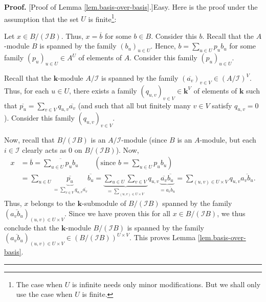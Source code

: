\documentclass[numbers=enddot,12pt,final,onecolumn,notitlepage]{scrartcl}%
\theoremstyle{definition}
\newenvironment{proof}[1][Proof]{\noindent\textbf{#1.} }{\ \rule{0.5em}{0.5em}}
\let\sumnonlimits\sum
\renewcommand{\sum}{\sumnonlimits\limits}
\begin{document}
\begin{proof}
[Proof of Lemma \ref{lem.basis-over-basis}.]Easy. Here is the proof under the
assumption that the set $U$ is finite\footnote{The case when $U$ is infinite
needs only minor modifications. But we shall only use the case when $U$ is
finite.}:

Let $x\in B/\left(  \mathcal{I}B\right)  $. Thus, $x=\overline{b}$ for some
$b\in B$. Consider this $b$. Recall that the $A$-module $B$ is spanned by the
family $\left(  b_{u}\right)  _{u\in U}$. Hence, $b=\sum_{u\in U}p_{u}b_{u}$
for some family $\left(  p_{u}\right)  _{u\in U}\in A^{U}$ of elements of $A$.
Consider this family $\left(  p_{u}\right)  _{u\in U}$.

Recall that the $\mathbf{k}$-module $A/\mathcal{I}$ is spanned by the family
$\left(  \overline{a_{v}}\right)  _{v\in V}\in\left(  A/\mathcal{I}\right)
^{V}$. Thus, for each $u\in U$, there exists a family $\left(  q_{u,v}\right)
_{v\in V}\in\mathbf{k}^{V}$ of elements of $\mathbf{k}$ such that
$\overline{p_{u}}=\sum_{v\in V}q_{u,v}\overline{a_{v}}$ (and such that all but
finitely many $v\in V$ satisfy $q_{u,v}=0$). Consider this family $\left(
q_{u,v}\right)  _{v\in V}$.

Now, recall that $B/\left(  \mathcal{I}B\right)  $ is an $A/\mathcal{I}%
$-module (since $B$ is an $A$-module, but each $i\in\mathcal{I}$ clearly acts
as $0$ on $B/\left(  \mathcal{I}B\right)  $). Now,%
\begin{align*}
x  &  =\overline{b}=\overline{\sum_{u\in U}p_{u}b_{u}}%
\ \ \ \ \ \ \ \ \ \ \left(  \text{since }b=\sum_{u\in U}p_{u}b_{u}\right) \\
&  =\sum_{u\in U}\underbrace{\overline{p_{u}}}_{=\sum_{v\in V}q_{u,v}%
\overline{a_{v}}}\overline{b_{u}}=\underbrace{\sum_{u\in U}\sum_{v\in V}%
}_{=\sum_{\left(  u,v\right)  \in U\times V}}q_{u,v}\underbrace{\overline
{a_{v}}\overline{b_{u}}}_{=\overline{a_{v}b_{u}}}=\sum_{\left(  u,v\right)
\in U\times V}q_{u,v}\overline{a_{v}b_{u}}.
\end{align*}
Thus, $x$ belongs to the $\mathbf{k}$-submodule of $B/\left(  \mathcal{I}%
B\right)  $ spanned by the family \newline$\left(  \overline{a_{v}b_{u}%
}\right)  _{\left(  u,v\right)  \in U\times V}$. Since we have proven this for
all $x\in B/\left(  \mathcal{I}B\right)  $, we thus conclude that the
$\mathbf{k}$-module $B/\left(  \mathcal{I}B\right)  $ is spanned by the family
$\left(  \overline{a_{v}b_{u}}\right)  _{\left(  u,v\right)  \in U\times V}%
\in\left(  B/\left(  \mathcal{I}B\right)  \right)  ^{U\times V}$. This proves
Lemma \ref{lem.basis-over-basis}.
\end{proof}
\end{document}
